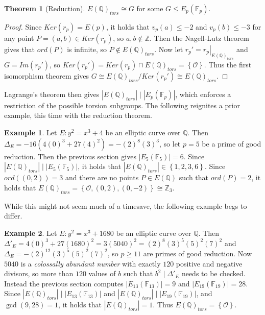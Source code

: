 \documentclass{article}
\newcommand{\F}{\mathbb{F}}
\newcommand{\Z}{\mathbb{Z}}
\newcommand{\Q}{\mathbb{Q}}
\newcommand{\val}[1]{\left. #1 \right\rvert}
\newcommand{\rb}[1]{\left( #1 \right)}
\newcommand{\cb}[1]{\left\{ #1 \right\}}
\newcommand{\abs}[1]{\left\lvert #1 \right\rvert}
\theoremstyle{definition}
\newtheorem*{example}{Example}
\newtheorem{theorem}[proposition]{Theorem}
\begin{document}
\begin{theorem}[Reduction]
$ E\rb{\Q}_{tors} \cong G $ for some $ G \le E_p\rb{\F_p} $.
\end{theorem}

\begin{proof}
Since $ Ker\rb{r_p} = E\rb{p} $, it holds that $ v_p\rb{a} \le -2 $ and $ v_p\rb{b} \le -3 $ for any point $ P = \rb{a, b} \in Ker\rb{r_p} $, so $ a, b \notin \Z $. Then the Nagell-Lutz theorem gives that $ ord\rb{P} $ is infinite, so $ P \notin E\rb{\Q}_{tors} $. Now let $ r_p' = \val{r_p}_{E\rb{\Q}_{tors}} $ and $ G = Im\rb{r_p'} $, so $ Ker\rb{r_p'} = Ker\rb{r_p} \cap E\rb{\Q}_{tors} = \cb{\mathcal{O}} $. Thus the first isomorphism theorem gives $ G \cong E\rb{\Q}_{tors} / Ker\rb{r_p'} \cong E\rb{\Q}_{tors} $.
\end{proof}

Lagrange's theorem then gives $ \abs{E\rb{\Q}_{tors}} \mid \abs{E_p\rb{\F_p}} $, which enforces a restriction of the possible torsion subgroups. The following reignites a prior example, this time with the reduction theorem.

\begin{example}
Let $ E : y^2 = x^3 + 4 $ be an elliptic curve over $ \Q $. Then $ \Delta_E = -16\rb{4\rb{0}^3 + 27\rb{4}^2} = -\rb{2}^8\rb{3}^3 $, so let $ p = 5 $ be a prime of good reduction. Then the previous section gives $ \abs{E_5\rb{\F_5}} = 6 $. Since $ \abs{E\rb{\Q}_{tors}} \mid \abs{E_5\rb{\F_5}} $, it holds that $ \abs{E\rb{\Q}_{tors}} \in \cb{1, 2, 3, 6} $. Since $ ord\rb{\rb{0, 2}} = 3 $ and there are no points $ P \in E\rb{\Q} $ such that $ ord\rb{P} = 2 $, it holds that $ E\rb{\Q}_{tors} = \cb{\mathcal{O}, \rb{0, 2}, \rb{0, -2}} \cong \Z_3 $.
\end{example}

While this might not seem much of a timesave, the following example begs to differ.

\begin{example}
Let $ E : y^2 = x^3 + 1680 $ be an elliptic curve over $ \Q $. Then $ \Delta'_E = 4\rb{0}^3 + 27\rb{1680}^2 = 3\rb{5040}^2 = \rb{2}^8\rb{3}^5\rb{5}^2\rb{7}^2 $ and $ \Delta_E = -\rb{2}^{12}\rb{3}^5\rb{5}^2\rb{7}^2 $, so $ p \ge 11 $ are primes of good reduction. Now $ 5040 $ is a \emph{colossally abundant number} with exactly $ 120 $ positive and negative divisors, so more than $ 120 $ values of $ b $ such that $ b^2 \mid \Delta'_E $ needs to be checked. Instead the previous section computes $ \abs{E_{13}\rb{\F_{13}}} = 9 $ and $ \abs{E_{19}\rb{\F_{19}}} = 28 $. Since $ \abs{E\rb{\Q}_{tors}} \mid \abs{E_{13}\rb{\F_{13}}} $ and $ \abs{E\rb{\Q}_{tors}} \mid \abs{E_{19}\rb{\F_{19}}} $, and $ \gcd\rb{9, 28} = 1 $, it holds that $ \abs{E\rb{\Q}_{tors}} = 1 $. Thus $ E\rb{\Q}_{tors} = \cb{\mathcal{O}} $.
\end{example}
\end{document}
